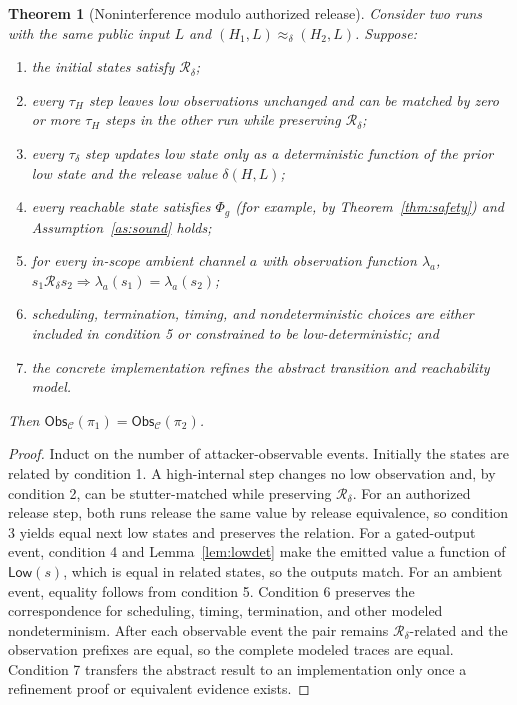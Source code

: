 \documentclass[11pt,letterpaper]{article}
\theoremstyle{plain}
\newtheorem{theorem}{Theorem}
\theoremstyle{definition}
\newcommand{\Low}{\mathsf{Low}}
\newcommand{\Obs}{\mathsf{Obs}}
\newcommand{\Rd}{\mathrel{\mathcal{R}_\delta}}
\begin{document}
\begin{theorem}[Noninterference modulo authorized release]\label{thm:ni}
Consider two runs with the same public input $L$ and $(H_1, L) \approx_\delta (H_2, L)$. Suppose:
\begin{enumerate}[leftmargin=*,itemsep=1pt]
\item the initial states satisfy $\Rd$;
\item every $\tau_H$ step leaves low observations unchanged and can be matched by zero or more $\tau_H$ steps in the other run while preserving $\Rd$;
\item every $\tau_\delta$ step updates low state only as a deterministic function of the prior low state and the release value $\delta(H, L)$;
\item every reachable state satisfies $\Phi_g$ (for example, by Theorem~\ref{thm:safety}) and Assumption~\ref{as:sound} holds;
\item for every in-scope ambient channel $a$ with observation function $\lambda_a$, $s_1 \Rd s_2 \Rightarrow \lambda_a(s_1) = \lambda_a(s_2)$;
\item scheduling, termination, timing, and nondeterministic choices are either included in condition 5 or constrained to be low-deterministic; and
\item the concrete implementation refines the abstract transition and reachability model.
\end{enumerate}
Then $\Obs_{\mathcal{C}}(\pi_1) = \Obs_{\mathcal{C}}(\pi_2)$.
\end{theorem}
\begin{proof}
Induct on the number of attacker-observable events. Initially the states are related by condition 1. A high-internal step changes no low observation and, by condition 2, can be stutter-matched while preserving $\Rd$. For an authorized release step, both runs release the same value by release equivalence, so condition 3 yields equal next low states and preserves the relation. For a gated-output event, condition 4 and Lemma~\ref{lem:lowdet} make the emitted value a function of $\Low(s)$, which is equal in related states, so the outputs match. For an ambient event, equality follows from condition 5. Condition 6 preserves the correspondence for scheduling, timing, termination, and other modeled nondeterminism. After each observable event the pair remains $\Rd$-related and the observation prefixes are equal, so the complete modeled traces are equal. Condition 7 transfers the abstract result to an implementation only once a refinement proof or equivalent evidence exists.
\end{proof}
\end{document}
